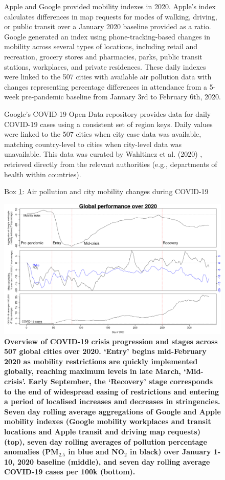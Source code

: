 \documentclass[preprint,10pt]{elsarticle} %
\begin{document}
\begin{figure}
{{Apple\cite{Apple2020} and Google\cite{Google2020} provided mobility indexes in 2020. Apple's index calculates differences in map requests for modes of walking, driving, or public transit over a January 2020 baseline provided as a ratio. Google generated an index using phone-tracking-based changes in mobility across several types of locations, including retail and recreation, grocery stores and pharmacies, parks, public transit stations, workplaces, and private residences. These daily indexes were linked to the 507 cities with available air pollution data with changes representing percentage differences in attendance from a 5-week pre-pandemic baseline from January 3rd to February 6th, 2020\cite{owidcoronavirus}.

Google's COVID-19 Open Data repository\cite{Google2022} provides data for daily COVID-19 cases using a consistent set of region keys. Daily values were linked to the 507 cities when city case data was available, matching country-level to cities when city-level data was unavailable. This data was curated by Wahltinez et al. (2020) \citep{Wahltinez2020}, retrieved directly from the relevant authorities (e.g., departments of health within countries).

}}
\captionsetup{labelformat=empty}
\caption{Box \ref{box:pollution}: Air pollution and city mobility changes during COVID-19}\label{box:pollution}
\end{figure}




\begin{figure}
\centering
\includegraphics[trim={0 0 15 20},clip,scale=0.45]{Images/LancetPHOverall.png}
\caption{\bf Overview of COVID-19 crisis progression and stages across 507 global cities over 2020. `Entry' begins mid-February 2020 as mobility restrictions are quickly implemented globally, reaching maximum levels in late March, `Mid-crisis'. Early September, the `Recovery' stage corresponds to the end of widespread easing of restrictions and entering a period of localised increases and decreases in stringencies. Seven day rolling average aggregations of Google and Apple mobility indexes (Google mobility workplaces and transit locations and Apple transit and driving map requests) (top), seven day rolling averages of pollution percentage anomalies (PM$_{2.5}$ in blue and NO$_{2}$ in black) over January 1-10, 2020 baseline (middle), and seven day rolling average COVID-19 cases per 100k (bottom).}
 \label{fig:stages}
\end{figure}
\end{document}
